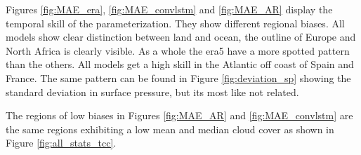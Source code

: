 Figures \ref{fig:MAE_era}, \ref{fig:MAE_convlstm} and \ref{fig:MAE_AR} display the temporal skill of the parameterization. %
They show different regional biases. All models show clear distinction between land and ocean, the outline of Europe and North Africa is clearly visible.
As a whole the \acrshort{era5} have a more spotted pattern than the others. All models get a high skill in the Atlantic off coast of Spain and France. The same pattern can be found in Figure \ref{fig:deviation_sp} showing the standard deviation in surface pressure, but its most like not related.

The regions of low biases in Figures \ref{fig:MAE_AR} and \ref{fig:MAE_convlstm} are the same regions exhibiting a low mean and median cloud cover as shown in Figure \ref{fig:all_stats_tcc}.

